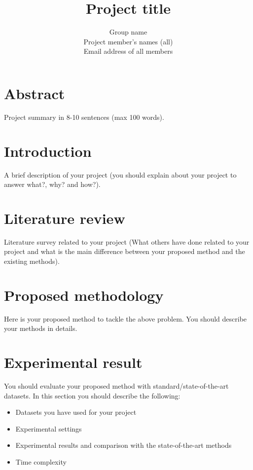 \documentclass[11pt, oneside]{article}   	%
\title{Project title}
\author{Group name\\
Project member's names (all)\\
Email address of all members}
\begin{document}
\maketitle

\section*{Abstract}

Project summary in 8-10 sentences (max 100 words).

\section{Introduction}
A brief description of your project (you should explain about your project to answer what?, why? and how?).

\section{Literature review}
Literature survey related to your project (What others have done related to your project and what is the main difference between your proposed method and the existing methods).

\section{Proposed methodology}
Here is your proposed method to tackle the above problem. You should describe your methods in details.

\section{Experimental result}

You should evaluate your proposed method with standard/state-of-the-art datasets. In this section you should describe the following:

\begin{itemize}
	\item Datasets you have used for your project
	\item Experimental settings 
	\item Experimental results and comparison with the state-of-the-art methods
	\item Time complexity
\end{itemize}
\end{document}

